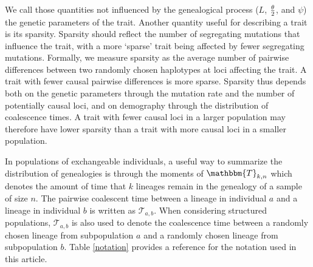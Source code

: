 We call those quantities not influenced by the genealogical process ($L$, $\frac{\theta}{2}$,
and $\psi$) the genetic parameters of the trait. Another quantity useful for
describing a trait is its sparsity. Sparsity should reflect the number of
segregating mutations that influence the trait, with a more `sparse' trait being
affected by fewer segregating mutations. Formally, we measure sparsity as the
average number of pairwise differences between two randomly chosen haplotypes at
loci affecting the trait. A trait with fewer causal pairwise differences is more
sparse. Sparsity thus depends both on the genetic parameters through the
mutation rate and the number of potentially causal loci, and on demography
through the distribution of coalescence times. A trait with fewer causal loci in
a larger population may therefore have lower sparsity than a trait with more
causal loci in a smaller population.


In populations of exchangeable individuals, a useful way to summarize the
distribution of genealogies is through the moments of $\mathbbm{T}_{k,n}$ which
denotes the amount of time that $k$ lineages remain in the genealogy of a sample
of size $n$. The pairwise coalescent time between a lineage in individual $a$
and a lineage in individual $b$ is written as $\mathcal{T}_{a,b}$. When
considering structured populations, $\mathcal{T}_{a,b}$ is also used to denote
the coalescence time between a randomly chosen lineage from subpopulation $a$
and a randomly chosen lineage from subpopulation $b$. Table \ref{notation}
provides a reference for the notation used in this article.

